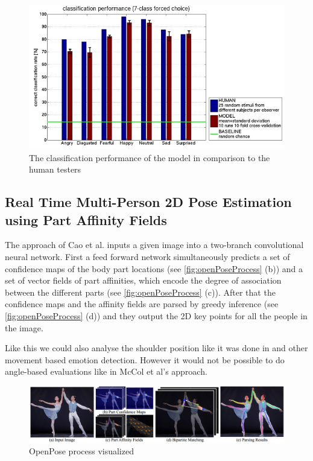 \documentclass[conference]{IEEEtran}
\begin{document}
\begin{figure}[H]
\centering
\includegraphics[width=\linewidth]{biologicallyInspiredNeuralModelEval.jpg}
\caption{The classification performance of the model in comparison to the human testers\cite{schindler2008recognizing}}
\label{fig:biologicallyInspiredNeuralModelEval}
\end{figure}





\subsection{Real Time Multi-Person 2D Pose Estimation using Part Affinity Fields}
The approach of Cao et al.\cite{cao2017realtime} inputs a given image into a two-branch convolutional neural network. First a feed forward network simultaneously predicts a set of confidence maps of the body part locations (see \autoref{fig:openPoseProcess} (b)) and a set of vector fields of part affinities, which encode the degree of association between the different parts (see \autoref{fig:openPoseProcess} (c)). After that the confidence maps and the affinity fields are parsed by greedy inference (see \autoref{fig:openPoseProcess} (d)) and they output the 2D key points for all the people in the image.

Like this we could also analyse the shoulder position like it was done in \cite{barathi2016lie} and other movement based emotion detection. However it would not be possible to do angle-based evaluations like in McCol et al's approach\cite{mccoll2012affect}. 

\begin{figure}[H]
\centering
\includegraphics[width=\linewidth]{openPoseProcess.jpg}
\caption{OpenPose process visualized\cite{cao2017realtime}}
\label{fig:openPoseProcess}
\end{figure}
\end{document}

